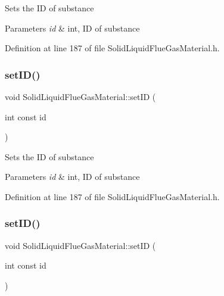 Sets the ID of substance 
\begin{DoxyParams}{Parameters}
{\em id} & int, ID of substance \\
\hline
\end{DoxyParams}


Definition at line 187 of file Solid\+Liquid\+Flue\+Gas\+Material.\+h.

\mbox{\label{class_solid_liquid_flue_gas_material_a6046d06703bd496745121b62eab4f40f}} 
\subsubsection{\texorpdfstring{set\+I\+D()}{setID()}\hspace{0.1cm}{\footnotesize\ttfamily [2/3]}}
{\footnotesize\ttfamily void Solid\+Liquid\+Flue\+Gas\+Material\+::set\+ID (\begin{DoxyParamCaption}\item[{int const}]{id }\end{DoxyParamCaption})\hspace{0.3cm}{\ttfamily [inline]}}

Sets the ID of substance 
\begin{DoxyParams}{Parameters}
{\em id} & int, ID of substance \\
\hline
\end{DoxyParams}


Definition at line 187 of file Solid\+Liquid\+Flue\+Gas\+Material.\+h.

\mbox{\label{class_solid_liquid_flue_gas_material_a6046d06703bd496745121b62eab4f40f}} 
\subsubsection{\texorpdfstring{set\+I\+D()}{setID()}\hspace{0.1cm}{\footnotesize\ttfamily [3/3]}}
{\footnotesize\ttfamily void Solid\+Liquid\+Flue\+Gas\+Material\+::set\+ID (\begin{DoxyParamCaption}\item[{int const}]{id }\end{DoxyParamCaption})\hspace{0.3cm}{\ttfamily [inline]}}

